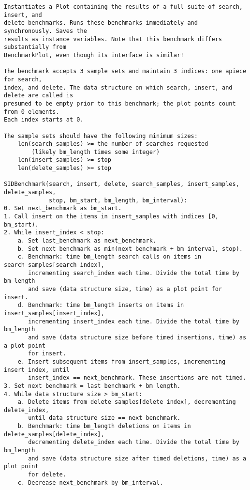 \documentclass{article}
\begin{document}
\begin{Verbatim}
Instantiates a Plot containing the results of a full suite of search, insert, and
delete benchmarks. Runs these benchmarks immediately and synchronously. Saves the
results as instance variables. Note that this benchmark differs substantially from
BenchmarkPlot, even though its interface is similar!

The benchmark accepts 3 sample sets and maintain 3 indices: one apiece for search,
index, and delete. The data structure on which search, insert, and delete are called is
presumed to be empty prior to this benchmark; the plot points count from 0 elements.
Each index starts at 0.

The sample sets should have the following minimum sizes:
    len(search_samples) >= the number of searches requested 
        (likely bm_length times some integer)
    len(insert_samples) >= stop
    len(delete_samples) >= stop

SIDBenchmark(search, insert, delete, search_samples, insert_samples, delete_samples,
             stop, bm_start, bm_length, bm_interval):
0. Set next_benchmark as bm_start.
1. Call insert on the items in insert_samples with indices [0, bm_start).
2. While insert_index < stop:
    a. Set last_benchmark as next_benchmark.
    b. Set next_benchmark as min(next_benchmark + bm_interval, stop).
    c. Benchmark: time bm_length search calls on items in search_samples[search_index],
       incrementing search_index each time. Divide the total time by bm_length 
       and save (data structure size, time) as a plot point for insert.
    d. Benchmark: time bm_length inserts on items in insert_samples[insert_index],
       incrementing insert_index each time. Divide the total time by bm_length 
       and save (data structure size before timed insertions, time) as a plot point
       for insert.
    e. Insert subsequent items from insert_samples, incrementing insert_index, until
       insert_index == next_benchmark. These insertions are not timed.
3. Set next_benchmark = last_benchmark + bm_length.
4. While data structure size > bm_start:
    a. Delete items from delete_samples[delete_index], decrementing delete_index,
       until data structure size == next_benchmark.
    b. Benchmark: time bm_length deletions on items in delete_samples[delete_index],
       decrementing delete_index each time. Divide the total time by bm_length 
       and save (data structure size after timed deletions, time) as a plot point
       for delete.
    c. Decrease next_benchmark by bm_interval.
\end{Verbatim}
\end{document}

